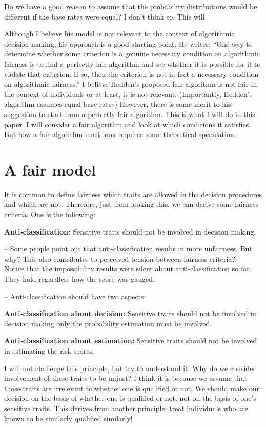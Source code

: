 \documentclass{article}
\begin{document}
Do we have a good reason to assume that the probability distributions would be different if the base rates were equal? I don't think so. This will 




Although I believe his model is not relevant to the context of algorithmic decision-making, his approach is a good starting point. He writes: “One way to determine whether some criterion is a genuine necessary condition on algorithmic fairness is to find a perfectly fair algorithm and see whether it is possible for it to violate that criterion. If so, then the criterion is not in fact a necessary condition on algorithmic fairness.” I believe Hedden’s proposed fair algorithm is not fair in the context of individuals or at least, it is not relevant. (Importantly, Hedden’s algorithm assumes equal base rates) However, there is some merit to his suggestion to start from a perfectly fair algorithm. This is what I will do in this paper. I will consider a fair algorithm and look at which conditions it satisfies. But how a fair algorithm must look requires some theoretical speculation.


\section{A fair model}

It is common to define fairness which traits are allowed in the decision procedures and which are not. Therefore, just from looking this, we can derive some fairness criteria. One is the following: 

 \textbf{Anti-classification:} Sensitive traits should not be involved in decision making. 

-- Some people point out that anti-classification results in more unfairness. But why? This also contributes to perceived tension between fairness criteria? 
-- Notice that the impossibility results were silent about anti-classification so far. They hold regardless how the score was gauged. 

-- Anti-classification should have two aspects:

\textbf{Anti-classification about decision:} Sensitive traits should not be involved in decision making only the probability estimation must be involved.

\textbf{Anti-classification about estimation:} Sensitive traits should not be involved in estimating the risk scores. 

I will not challenge this principle, but try to understand it. Why do we consider involvement of these traits to be unjust? I think it is because we assume that those traits are irrelevant to whether one is qualified or not. We should make our decision on the basis of whether one is qualified or not, not on the basis of one's sensitive traits. This derives from another principle: treat individuals who are known to be similarly qualified similarly!
\end{document}
